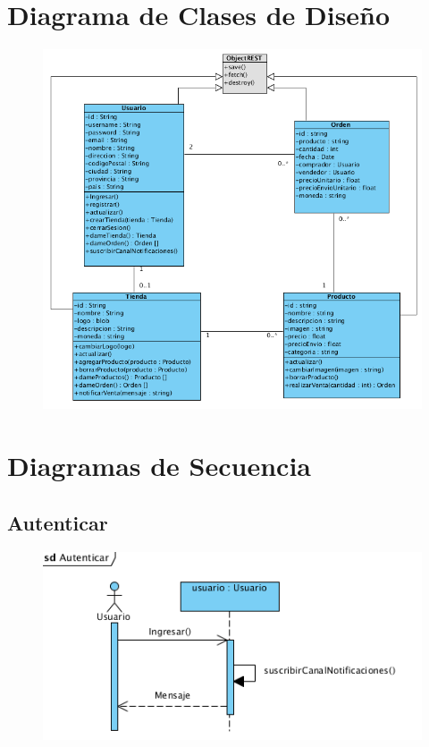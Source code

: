 \section{Diagrama de Clases de Diseño}

\begin{figure}[H]
  \centering
    \includegraphics[width=1\textwidth]{imagenes/disenio/clases-disenio.png}
    \label{fig:diagrama-clases-disenio}
\end{figure}

\section{Diagramas de Secuencia}

\subsection{Autenticar}
\begin{figure}[H]
  \centering
    \includegraphics{imagenes/disenio/secuencia-autenticar.png}
    \label{fig:diagrama-secuencia-autenticar}
\end{figure}


